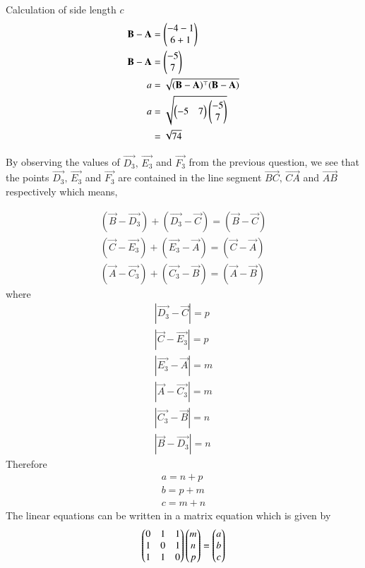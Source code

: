 \documentclass[journal,12pt,twocolumn]{IEEEtran}
\theoremstyle{remark}
\begin{document}
\vspace{0.3cm}
Calculation of side length $c$
\begin{align}
\mathbf{B}-\mathbf{A} &= \begin{pmatrix}-4-1\\6+1\end{pmatrix}\\
\mathbf{B}-\mathbf{A} &= \begin{pmatrix}-5\\7\end{pmatrix}\\
a &= \sqrt{(\mathbf{B}-\mathbf{A})^{\top}(\mathbf{B}-\mathbf{A})}\\
a &= \sqrt{\begin{pmatrix}-5&7\end{pmatrix}\begin{pmatrix}-5\\7\end{pmatrix}}\\
&= \sqrt{74}
\end{align}

\vspace{0.3cm}
By observing the values of $\vec{D_3},\, \vec{E_3}$ and $\vec{F_3}$ from the previous question, we see that the points $\vec{D_3},\, \vec{E_3}$ and $\vec{F_3}$ are contained in the line segment $\vec{BC}, \, \vec{CA}$ and $\vec{AB}$ respectively which means,

\begin{align}
(\vec{B}-\vec{D_3}) + (\vec{D_{3}}-\vec{C}) = (\vec{B}-\vec{C})\\
(\vec{C}-\vec{E_3}) + (\vec{E_{3}}-\vec{A}) = (\vec{C}-\vec{A})\\
(\vec{A}-\vec{C_3}) + (\vec{C_{3}}-\vec{B}) = (\vec{A}-\vec{B})
\end{align}
where
\begin{align}
|\vec{D_3}-\vec{C}|=p\\
|\vec{C}-\vec{E_3}|=p\\
|\vec{E_3}-\vec{A}|=m\\
|\vec{A}-\vec{C_3}|=m\\
|\vec{C_3}-\vec{B}|=n\\
|\vec{B}-\vec{D_3}|=n
\end{align}
Therefore
\begin{align}
a = n+p\\
b = p+m\\
c = m+n
\end{align}
The linear equations can be written in a matrix equation which is given by
\begin{align}
\begin{pmatrix}0&1&1\\1&0&1\\1&1&0\end{pmatrix}\begin{pmatrix}m\\n\\p\end{pmatrix} = \begin{pmatrix}a\\b\\c\end{pmatrix}
\end{align}
\end{document}
